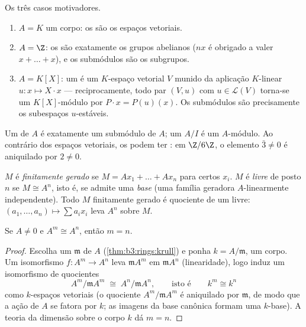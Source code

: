 \begin{example}\label{ex:b3:modules:examples}
Os três casos motivadores.
\begin{enumerate}
  \item $A = K$ um corpo: os  são os espaços vetoriais.
  \item $A = \Z$: os  são exatamente os grupos abelianos
        ($nx$ é obrigado a valer $x + \dots + x$), e os submódulos são os
        subgrupos.
  \item $A = K[X]$: um  é um $K$-espaço vetorial $V$ munido da
        aplicação $K$-linear $u\colon x \mapsto X\cdot x$ --- reciprocamente, todo par
        $(V, u)$ com $u \in \mathcal L(V)$ torna-se um $K[X]$-módulo por $P \cdot x = P(u)(x)$. Os
        submódulos são precisamente os subespaços $u$-estáveis.
\end{enumerate}
Um  de $A$ é exatamente um submódulo de $A$; um  $A/I$ é um $A$-módulo. Ao contrário dos espaços
vetoriais, os  podem ter \emph{}: em $\Z/6\Z$, o
elemento $\bar 3 \ne 0$ é aniquilado por $2 \neq 0$.
\end{example}

\begin{definition}\label{def:b3:modules:free}
$M$ é \emph{finitamente gerado} se
$M = Ax_1 + \dots + Ax_n$ para certos $x_i$. $M$ é \emph{livre} de
posto $n$ se $M \cong A^n$, isto é, se admite uma \emph{base} (uma família
geradora $A$-linearmente independente). Todo $M$ finitamente
gerado é quociente de um  livre: $(a_1, \dots, a_n) \mapsto \sum a_ix_i$ leva $A^n$ sobre
$M$.
\end{definition}

\begin{proposition}\label{prop:b3:modules:rank}
Se $A \neq 0$ e $A^m \cong A^n$, então $m = n$.
\end{proposition}

\begin{proof}
Escolha um  $\mathfrak m$ de $A$ (\cref{thm:b3:rings:krull}) e ponha $k = A/\mathfrak m$,
um corpo. Um isomorfismo $f \colon A^m
\to A^n$ leva $\mathfrak m A^m$ em $\mathfrak m A^n$ (linearidade), logo
induz um isomorfismo de quocientes
\[
A^m/\mathfrak m A^m \;\cong\; A^n/\mathfrak m A^n,
\qquad\text{isto é}\qquad k^m \cong k^n
\]
como $k$-espaços vetoriais (o quociente $A^m/\mathfrak m A^m$ é aniquilado por $\mathfrak m$,
de modo que a ação de $A$ se fatora por $k$; as imagens da base
canônica formam uma $k$-base). A teoria da dimensão sobre o corpo
$k$ dá $m = n$.
\end{proof}

